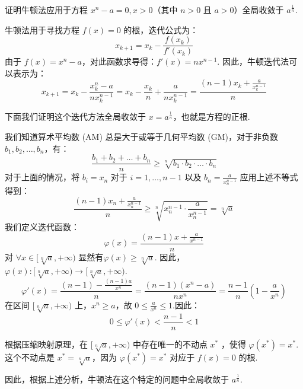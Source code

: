 \begin{tcolorbox}[breakable,
		colframe=white!10!jingga, coltitle=white!90!jingga, colback=white!95!jingga, coltext=black, colbacktitle=white!10!jingga, enhanced, fonttitle=\bfseries,fontupper=\normalsize, attach boxed title to top left={yshift=-2mm}, before skip=8pt, after skip=8pt,
		title=解答题]
证明牛顿法应用于方程 $ x^{n}-a=0, x>0 $（其中 $ n>0 $ 且 $ a>0 $）全局收敛于 $ a^{\frac{1}{n}} $.

\tcblower
牛顿法用于寻找方程 $f(x) = 0$ 的根，迭代公式为：
$$ x_{k+1} = x_k - \frac{f(x_k)}{f'(x_k)} $$
 由于 $f(x) = x^n - a $，对此函数求导得：$f'(x) = n x^{n-1}$. 因此，牛顿迭代法可以表示为：
$$ x_{k+1} = x_k - \frac{x_k^n - a}{n x_k^{n-1}} = x_k - \frac{x_k}{n} + \frac{a}{n x_k^{n-1}} = \frac{(n-1)x_k + \frac{a}{x_k^{n-1}}}{n} $$

下面我们证明这个迭代方法全局收敛于 $x = a^{\frac{1}{n}}$，也就是方程的正根.

我们知道算术平均数 (AM) 总是大于或等于几何平均数 (GM)，对于非负数 $b_1, b_2, \dots, b_n$，有：
$$
\frac{b_1 + b_2 + \dots + b_n}{n} \geqslant \sqrt[n]{b_1 \cdot b_2 \cdot \dots \cdot b_n}
$$
对于上面的情况，将 $b_i = x_n$ 对于 $i = 1, \dots, n-1$ 以及 $b_n = \frac{a}{x_n^{n-1}}$ 应用上述不等式得到：
$$
\frac{(n-1)x_n + \frac{a}{x_n^{n-1}}}{n} \geqslant \sqrt[n]{x_n^{n-1} \cdot \frac{a}{x_n^{n-1}}}= \sqrt[n]{a}
$$
我们定义迭代函数：
$$ \varphi(x) = \frac{(n-1)x + \frac{a}{x^{n-1}}}{n} $$
对 $\forall x \in [\sqrt[n]{a}, +\infty)$ 显然有$\varphi(x)\geqslant \sqrt[n]{a}$. 因此，$ \varphi(x): [\sqrt[n]{a}, +\infty) \to [\sqrt[n]{a}, +\infty) $.
$$ \varphi'(x) = \frac{(n-1) - \frac{(n-1)a}{x^n}}{n} = \frac{(n-1)(x^n - a)}{nx^n}  = \frac{n-1}{n} \left(1 - \frac{a}{x^n}\right) $$
在区间 $[\sqrt[n]{a}, +\infty)$ 上，$ x^n \geqslant a $，故 $ 0 \leqslant \frac{a}{x^n} \leqslant 1 $.因此：
$$ 0 \leqslant \varphi'(x) < \frac{n-1}{n} < 1 $$



根据压缩映射原理，在 $[\sqrt[n]{a}, +\infty)$ 中存在唯一的不动点 $ x^* $ ，使得 $ \varphi(x^*) = x^* $.这个不动点是 $ x^* = \sqrt[n]{a} $，因为 $ \varphi(x^*) = x^* $ 对应于 $ f(x) = 0 $ 的根.


因此，根据上述分析，牛顿法在这个特定的问题中全局收敛于 $a^{\frac{1}{n}}$.
\end{tcolorbox}





